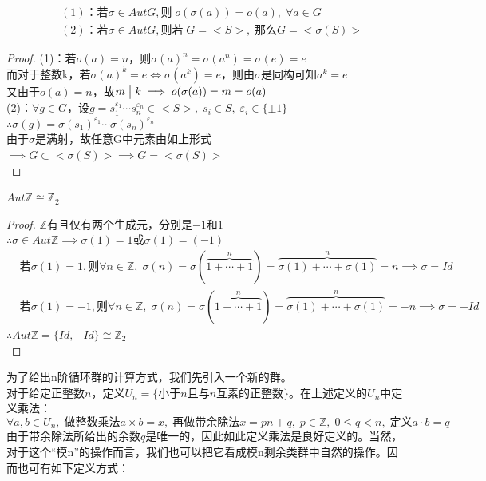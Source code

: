 \begin{align*}
&(1)\text{：若}\sigma \in AutG,\text{则}\; o(\sigma(a))=o(a),\; \forall a\in G\\
&(2)\text{：若}\sigma \in AutG,\text{则若}\;G=<S>,\;\text{那么}G=<\sigma(S)>
\end{align*}
\begin{proof}
(1)：若$o(a)=n$，则$\sigma(a)^n=\sigma(a^n)=\sigma(e)=e$\\
而对于整数k，若$\sigma(a)^k=e\iff \sigma(a^k)=e$，则由$\sigma$是同构可知$a^k=e$\\
又由于$o(a)=n$，故$m\bigm|k\implies o(\sigma(a))=m=o(a)$\\
(2)：$\forall g\in G$，设$g=s_1^{\varepsilon_1}\cdots s_n^{\varepsilon_n}\in <S>,\; s_i\in S,\; \varepsilon_i\in\{\pm1\}$\\
$\therefore \sigma(g)=\sigma(s_1)^{\varepsilon_1}\cdots \sigma(s_n)^{\varepsilon_n}$\\
由于$\sigma$是满射，故任意G中元素由如上形式$\implies G\subset<\sigma(S)>\implies G=<\sigma(S)>$\\
\end{proof}
$Aut\mathbb{Z}\cong\mathbb{Z}_2$
\begin{proof}
$\mathbb{Z}$有且仅有两个生成元，分别是$-1$和$1$\\
$\therefore \sigma\in Aut\mathbb{Z}\implies\sigma(1)=1\text{或}\sigma(1)=(-1)$\\
\[
\begin{aligned}
&\text{若}\sigma(1)=1,\text{则}\forall n\in \mathbb{Z},\; \sigma(n)=\sigma(\overbrace{1+\cdots +1}^n)=\overbrace{\sigma(1)+\cdots+\sigma(1)}^n=n\implies \sigma=Id\\
&\text{若}\sigma(1)=-1,\text{则}\forall n\in \mathbb{Z},\; \sigma(n)=\sigma(\overbrace{1+\cdots +1}^n)=\overbrace{\sigma(1)+\cdots+\sigma(1)}^n=-n\implies \sigma=-Id
\end{aligned}
\]
$\therefore Aut\mathbb{Z}=\{Id,-Id\}\cong \mathbb{Z}_2$\\
\end{proof}
 为了给出n阶循环群的计算方式，我们先引入一个新的群。\\
对于给定正整数$n$，定义$U_n=\{\text{小于}n\text{且与}n\text{互素的正整数}\}$。在上述定义的$U_n$中定义乘法：
\[
\forall a,b\in U_n,\; \text{做整数乘法}a\times b=x,\; \text{再做带余除法}x=pn+q,\; p\in \mathbb{Z},\; 0\leq q <n,\; \text{定义}a\cdot b=q
\]
由于带余除法所给出的余数$q$是唯一的，因此如此定义乘法是良好定义的。当然，对于这个“模n”的操作而言，我们也可以把它看成模n剩余类群中自然的操作。因而也可有如下定义方式：\\
